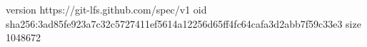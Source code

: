 version https://git-lfs.github.com/spec/v1
oid sha256:3ad85fe923a7c32c5727411ef5614a12256d65ff4fc64cafa3d2abb7f59c33e3
size 1048672
